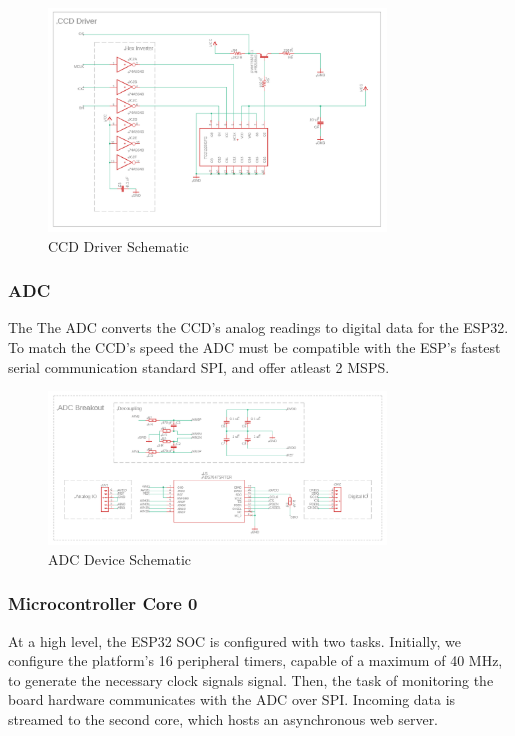 \documentclass{article}
\begin{document}
        \begin{figure}[H]
        \centering
        \includegraphics[width=0.8\textwidth]{images/ccdschem.PNG}
        \caption{\label{fig:ccdsc}CCD Driver Schematic}
        \end{figure}
        
        \subsubsection{ADC}
        The The ADC converts the CCD's analog readings to digital data for the ESP32. To match the CCD's speed the ADC must be compatible with the ESP's fastest serial communication standard SPI, and offer atleast 2 MSPS.
        
        \begin{figure}[H]
        \centering
        \includegraphics[width=0.8\textwidth]{images/adcschem.PNG}
        \caption{\label{fig:adcsc}ADC Device Schematic}
        \end{figure}
        
        \subsubsection{Microcontroller Core 0}
             At a high level, the ESP32 SOC is configured with two tasks. Initially, we configure the platform's 16 peripheral timers, capable of a maximum of 40 MHz, to generate the necessary clock signals signal. Then, the task of monitoring the board hardware communicates with the ADC over SPI. Incoming data is streamed to the second core, which hosts an asynchronous web server.
             
\end{document}
